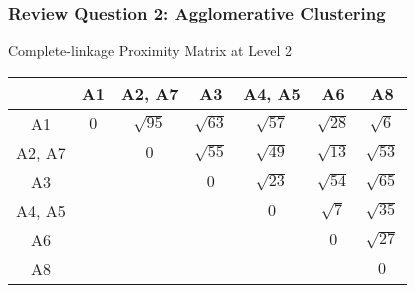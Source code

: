 \documentclass[aspectratio=169, 10pt]{beamer}
\begin{document}
\begin{frame}[t]
    \frametitle{Review Question 2: Agglomerative Clustering}
    \small

    Complete-linkage Proximity Matrix at Level 2

    \begin{table}[]
        \scriptsize
        \begin{tabular}{c|cccccc}
                                                        & {\color[HTML]{000000} A1}  & {\color[HTML]{000000} A2, A7}      & {\color[HTML]{000000} A3}          & {\color[HTML]{000000} A4, A5}      & {\color[HTML]{000000} A6}          & {\color[HTML]{000000} A8}          \\ \hline
        {\color[HTML]{000000} A1}                       & {\color[HTML]{000000} $0$} & {\color[HTML]{000000} $\sqrt{95}$} & {\color[HTML]{000000} $\sqrt{63}$} & {\color[HTML]{000000} $\sqrt{57}$} & {\color[HTML]{000000} $\sqrt{28}$} & {\color[HTML]{fe0000} $\sqrt{6}$}  \\
        {\color[HTML]{000000} A2, A7}                   & {\color[HTML]{000000} }    & {\color[HTML]{000000} $0$}         & {\color[HTML]{000000} $\sqrt{55}$} & {\color[HTML]{000000} $\sqrt{49}$} & {\color[HTML]{000000} $\sqrt{13}$} & {\color[HTML]{000000} $\sqrt{53}$} \\
        {\color[HTML]{000000} A3}                       & {\color[HTML]{000000} }    & {\color[HTML]{000000} }            & {\color[HTML]{000000} $0$}         & {\color[HTML]{000000} $\sqrt{23}$} & {\color[HTML]{000000} $\sqrt{54}$} & {\color[HTML]{000000} $\sqrt{65}$} \\
        {\color[HTML]{000000} A4, A5}                   & {\color[HTML]{000000} }    & {\color[HTML]{000000} }            & {\color[HTML]{000000} }            & {\color[HTML]{000000} $0$}         & {\color[HTML]{000000} $\sqrt{7}$}  & {\color[HTML]{000000} $\sqrt{35}$} \\
        {\color[HTML]{000000} A6}                       & {\color[HTML]{000000} }    & {\color[HTML]{000000} }            & {\color[HTML]{000000} }            & {\color[HTML]{000000} }            & {\color[HTML]{000000} $0$}         & {\color[HTML]{000000} $\sqrt{27}$} \\
        {\color[HTML]{000000} A8}                       & {\color[HTML]{000000} }    & {\color[HTML]{000000} }            & {\color[HTML]{000000} }            & {\color[HTML]{000000} }            & {\color[HTML]{000000} }            & {\color[HTML]{000000} $0$}        
        \end{tabular}
    \end{table}


\end{frame}
\end{document}
